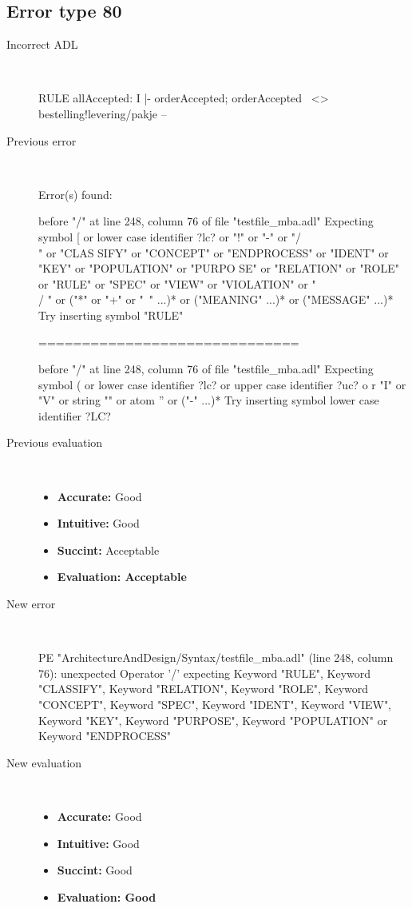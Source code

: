 \subsection{Error type 80}
  \begin{description}
  \item[Incorrect ADL]~\\
\begin{adl}
RULE allAccepted: I |- orderAccepted; orderAccepted~ <> bestelling!levering/pakje --\end{adl}
  \item[Previous error]~\\
\begin{haskell}
Error(s) found:

before "/" at line 248, column 76 of file "testfile_mba.adl"
Expecting symbol [ or lower case identifier ?lc? or "!" or "-" or "/\\" or "CLAS
SIFY" or "CONCEPT" or "ENDPROCESS" or "IDENT" or "KEY" or "POPULATION" or "PURPO
SE" or "RELATION" or "ROLE" or "RULE" or "SPEC" or "VIEW" or "VIOLATION" or "\\/
" or ("*" or "+" or "~" ...)* or ("MEANING" ...)* or ("MESSAGE" ...)*
Try inserting symbol "RULE"

==============================

before "/" at line 248, column 76 of file "testfile_mba.adl"
Expecting symbol ( or lower case identifier ?lc? or upper case identifier ?uc? o
r "I" or "V" or string "" or atom '' or ("-" ...)*
Try inserting symbol lower case identifier ?LC?\end{haskell}
  \item[Previous evaluation]~\\
    \begin{itemize}
    \item \textbf{Accurate:} Good
    \item \textbf{Intuitive:} Good
    \item \textbf{Succint:} Acceptable
    \item \textbf{Evaluation: Acceptable}
    \end{itemize}
  \item[New error]~\\
\begin{haskell}
PE "ArchitectureAndDesign/Syntax/testfile_mba.adl" (line 248, column 76):
unexpected Operator '/'
expecting Keyword "RULE", Keyword "CLASSIFY", Keyword "RELATION", Keyword "ROLE", Keyword "CONCEPT", Keyword "SPEC", Keyword "IDENT", Keyword "VIEW", Keyword "KEY", Keyword "PURPOSE", Keyword "POPULATION" or Keyword "ENDPROCESS"
\end{haskell}
  \item[New evaluation]~\\
    \begin{itemize}
    \item \textbf{Accurate:} Good
    \item \textbf{Intuitive:} Good
    \item \textbf{Succint:} Good
    \item \textbf{Evaluation: Good
}
    \end{itemize}
  \end{description}

